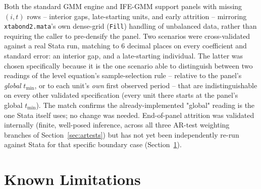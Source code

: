 \documentclass[11pt,a4paper]{article}
\begin{document}
Both the standard GMM engine and IFE-GMM support panels with missing
$(i,t)$ rows -- interior gaps, late-starting units, and early attrition --
mirroring \texttt{xtabond2.mata}'s own dense-grid (\texttt{Fill}) handling
of unbalanced data, rather than requiring the caller to pre-densify the
panel. Two scenarios were cross-validated against a real Stata run,
matching to 6 decimal places on every coefficient and standard error: an
interior gap, and a late-starting individual. The latter was chosen
specifically because it is the one scenario able to distinguish between
two readings of the level equation's sample-selection rule -- relative to
the panel's \emph{global} $t_{\min}$, or to each unit's \emph{own} first
observed period -- that are indistinguishable on every other validated
specification (every unit there starts at the panel's global $t_{\min}$).
The match confirms the already-implemented "global" reading is the one
Stata itself uses; no change was needed. End-of-panel attrition was
validated internally (finite, well-posed inference, across all three
AR-test weighting branches of Section~\ref{sec:artests}) but has not yet
been independently re-run against Stata for that specific boundary case
(Section~\ref{sec:limitations}).

\section{Known Limitations}
\label{sec:limitations}
\end{document}
